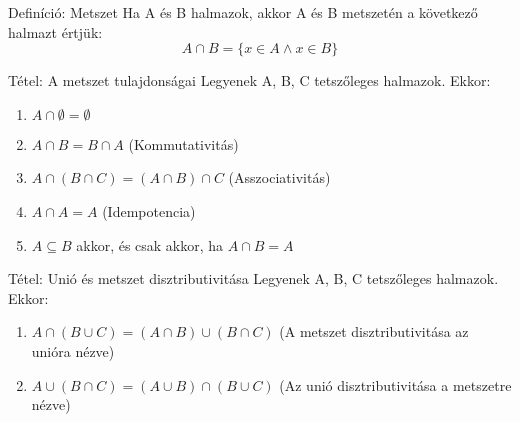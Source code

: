 \documentclass{beamer}
\begin{document}
\begin{frame}

\begin{block}{Definíció: Metszet}
Ha A és B halmazok, akkor A és B metszetén a következő halmazt értjük:\\
$$A \cap B = \{x \in A \wedge x \in B\}$$
\end{block}

\begin{block}{Tétel: A metszet tulajdonságai}
Legyenek A, B, C tetszőleges halmazok. Ekkor:

\begin{enumerate}
\item $A \cap \emptyset = \emptyset$
\item $A \cap B = B \cap A$ (Kommutativitás)
\item $A \cap (B \cap C) = (A \cap B) \cap C$ (Asszociativitás)
\item $A \cap A = A$ (Idempotencia)
\item $A \subseteq B$ akkor, és csak akkor, ha $A \cap B = A$
\end{enumerate}
\end{block}

\end{frame}

\begin{frame}

\begin{block}{Tétel: Unió és metszet disztributivitása}
Legyenek A, B, C tetszőleges halmazok. Ekkor:

\begin{enumerate}
\item $A \cap (B \cup C) = (A \cap B) \cup (B \cap C)$ (A metszet disztributivitása az unióra nézve)

\item $A \cup (B \cap C) = (A \cup B) \cap (B \cup C)$ (Az unió disztributivitása a metszetre nézve)
\end{enumerate}
\end{block}

\end{frame}
\end{document}
